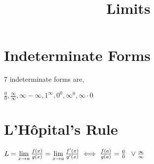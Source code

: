 \documentclass{article}
\title{Limits}
\date{}
\author{}
\begin{document}
\maketitle

\section{Indeterminate Forms}
7 indeterminate forms are,

$
\frac{0}{0}, \frac{\infty}{\infty}, \infty - \infty, 1^\infty, 0^0, \infty^0, \infty \cdot 0
$

\section{L'Hôpital's Rule}
$L=\lim\limits_{x \to a}{\frac{f(x)}{g(x)}}= \lim\limits_{x\to a}{\frac{f'(x)}{g'(x)}}\iff \frac{f(a)}{g(a)}=\frac{0}{0} \hspace{2mm} \lor \frac{\infty}{\infty}$
\end{document}

